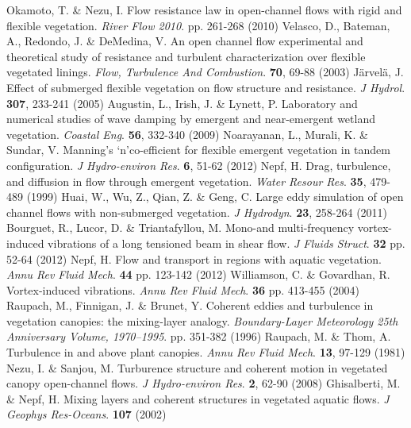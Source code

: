 \documentclass[lineno,authoryear]{FLO_v1}%
\theoremstyle{definition}
\begin{document}
\begin{Backmatter}
\begin{thebibliography}{}
Okamoto, T. \& Nezu, I. Flow resistance law in open-channel flows with rigid and flexible vegetation. {\em River Flow 2010}. pp. 261-268 (2010)
Velasco, D., Bateman, A., Redondo, J. \& DeMedina, V. An open channel flow experimental and theoretical study of resistance and turbulent characterization over flexible vegetated linings. {\em Flow, Turbulence And Combustion}. \textbf{70}, 69-88 (2003)
Järvelä, J. Effect of submerged flexible vegetation on flow structure and resistance. {\em J Hydrol}. \textbf{307}, 233-241 (2005)
Augustin, L., Irish, J. \& Lynett, P. Laboratory and numerical studies of wave damping by emergent and near-emergent wetland vegetation. {\em Coastal Eng}. \textbf{56}, 332-340 (2009)
Noarayanan, L., Murali, K. \& Sundar, V. Manning’s ‘n’co-efficient for flexible emergent vegetation in tandem configuration. {\em J Hydro-environ Res}. \textbf{6}, 51-62 (2012)
Nepf, H. Drag, turbulence, and diffusion in flow through emergent vegetation. {\em Water Resour Res}. \textbf{35}, 479-489 (1999)
Huai, W., Wu, Z., Qian, Z. \& Geng, C. Large eddy simulation of open channel flows with non-submerged vegetation. {\em J Hydrodyn}. \textbf{23}, 258-264 (2011)
Bourguet, R., Lucor, D. \& Triantafyllou, M. Mono-and multi-frequency vortex-induced vibrations of a long tensioned beam in shear flow. {\em J Fluids Struct}. \textbf{32} pp. 52-64 (2012)
Nepf, H. Flow and transport in regions with aquatic vegetation. {\em Annu Rev Fluid Mech}. \textbf{44} pp. 123-142 (2012)
Williamson, C. \& Govardhan, R. Vortex-induced vibrations. {\em Annu Rev Fluid Mech}. \textbf{36} pp. 413-455 (2004)
Raupach, M., Finnigan, J. \& Brunet, Y. Coherent eddies and turbulence in vegetation canopies: the mixing-layer analogy. {\em Boundary-Layer Meteorology 25th Anniversary Volume, 1970–1995}. pp. 351-382 (1996)
Raupach, M. \& Thom, A. Turbulence in and above plant canopies. {\em Annu Rev Fluid Mech}. \textbf{13}, 97-129 (1981)
Nezu, I. \& Sanjou, M. Turburence structure and coherent motion in vegetated canopy open-channel flows. {\em J Hydro-environ Res}. \textbf{2}, 62-90 (2008)
Ghisalberti, M. \& Nepf, H. Mixing layers and coherent structures in vegetated aquatic flows. {\em J Geophys Res-Oceans}. \textbf{107} (2002)

\end{thebibliography}
\end{Backmatter}
\end{document}
